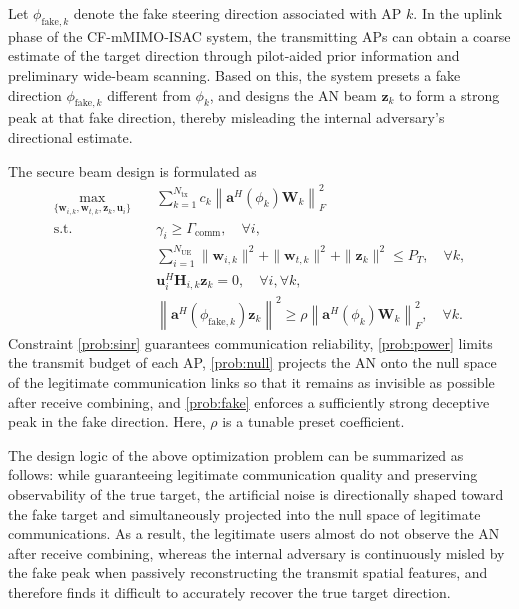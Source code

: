 \documentclass[conference,twocolumn,a4paper]{IEEEtran}
\begin{document}
Let $\phi_{\mathrm{fake},k}$ denote the fake steering direction associated with AP $k$. In the uplink phase of the CF-mMIMO-ISAC system, the transmitting APs can obtain a coarse estimate of the target direction through pilot-aided prior information and preliminary wide-beam scanning. Based on this, the system presets a fake direction $\phi_{\mathrm{fake},k}$ different from $\phi_k$, and designs the AN beam $\mathbf{z}_k$ to form a strong peak at that fake direction, thereby misleading the internal adversary's directional estimate.

The secure beam design is formulated as
\begin{subequations}
\begin{align}
\max_{\{\mathbf{w}_{i,k},\mathbf{w}_{t,k},\mathbf{z}_k,\mathbf{u}_i\}} \quad & \sum_{k=1}^{N_{\mathrm{tx}}}c_k\left\|\mathbf{a}^H(\phi_k)\mathbf{W}_k\right\|_F^2 \label{prob:obj}\\
\text{s.t.}\quad & \gamma_i\ge \Gamma_{\mathrm{comm}},\quad \forall i, \label{prob:sinr}\\
& \sum_{i=1}^{N_{\mathrm{UE}}}\|\mathbf{w}_{i,k}\|^2+\|\mathbf{w}_{t,k}\|^2+\|\mathbf{z}_k\|^2\le P_T,\quad \forall k, \label{prob:power}\\
& \mathbf{u}_i^H\mathbf{H}_{i,k}\mathbf{z}_k=0,\quad \forall i,\forall k, \label{prob:null}\\
& \left\|\mathbf{a}^H(\phi_{\mathrm{fake},k})\mathbf{z}_k\right\|^2\ge \rho\left\|\mathbf{a}^H(\phi_k)\mathbf{W}_k\right\|_F^2,\quad \forall k. \label{prob:fake}
\end{align}
\end{subequations}
Constraint \eqref{prob:sinr} guarantees communication reliability, \eqref{prob:power} limits the transmit budget of each AP, \eqref{prob:null} projects the AN onto the null space of the legitimate communication links so that it remains as invisible as possible after receive combining, and \eqref{prob:fake} enforces a sufficiently strong deceptive peak in the fake direction. Here, $\rho$ is a tunable preset coefficient.

The design logic of the above optimization problem can be summarized as follows: while guaranteeing legitimate communication quality and preserving observability of the true target, the artificial noise is directionally shaped toward the fake target and simultaneously projected into the null space of legitimate communications. As a result, the legitimate users almost do not observe the AN after receive combining, whereas the internal adversary is continuously misled by the fake peak when passively reconstructing the transmit spatial features, and therefore finds it difficult to accurately recover the true target direction.
\end{document}
